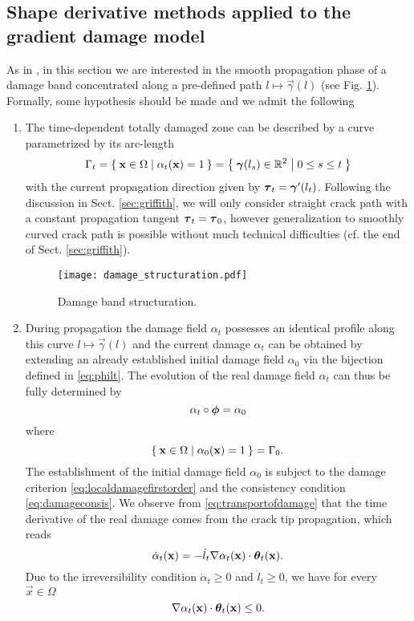 \subsection{Shape derivative methods applied to the gradient damage model}
As in \cite{SicsicMarigo:2013}, in this section we are interested in the smooth propagation phase of a damage band concentrated along a pre-defined path $l\mapsto\vec{\gamma}(l)$ (see Fig. \ref{fig:damage_structuration}). Formally, some hypothesis should be made and we admit the following
\begin{assumption} \label{assum:damageband}
\begin{enumerate}
\item The time-dependent totally damaged zone can be described by a curve parametrized by its arc-length
\begin{equation} \label{eq:graddamalt}
\Gamma_t=\set{\vec{x}\in\Omega|\alpha_t(\vec{x})=1}=\set{\vec{\gamma}(l_s)\in\mathbb{R}^2|0\leq s\leq t}
\end{equation}
with the current propagation direction given by $\vtau_t=\vec{\gamma}'(l_t)$. Following the discussion in Sect. \ref{sec:griffith}, we will only consider straight crack path with a constant propagation tangent $\vtau_t=\vtau_0$, however generalization to smoothly curved crack path is possible without much technical difficulties (cf. the end of Sect. \ref{sec:griffith}).
\begin{figure}[htbp]
\centering
\texttt{[image: damage\_structuration.pdf]}
\caption{Damage band structuration.} \label{fig:damage_structuration}
\end{figure}

\item During propagation the damage field $\alpha_t$ possesses an identical profile along this curve $l\mapsto\vec{\gamma}(l)$ and the current damage $\alpha_t$ can be obtained by extending an already established initial damage field $\alpha_0$ via the bijection defined in \eqref{eq:philt}. The evolution of the real damage field $\alpha_t$ can thus be fully determined by
\begin{equation} \label{eq:transportofdamage}
\alpha_t\circ\philt=\alpha_0
\end{equation}
where
\[
\set{\vec{x}\in\Omega|\alpha_0(\vec{x})=1}=\Gamma_0.
\]
The establishment of the initial damage field $\alpha_0$ is subject to the damage criterion \eqref{eq:localdamagefirstorder} and the consistency condition \eqref{eq:damageconsis}. We observe from \eqref{eq:transportofdamage} that the time derivative of the real damage comes from the crack tip propagation, which reads
\begin{equation} \label{eq:alphadot}
\dot{\alpha}_t(\vec{x})=-\dot{l}_t\nabla\alpha_t(\vec{x})\cdot\vtheta_t(\vec{x}).
\end{equation}
Due to the irreversibility condition $\dot{\alpha}_t\geq 0$ and $\dot{l}_t\geq 0$, we have for every $\vec{x}\in\Omega$
\[
\nabla\alpha_t(\vec{x})\cdot\vtheta_t(\vec{x})\leq 0.
\]
\end{enumerate}
\end{assumption}

